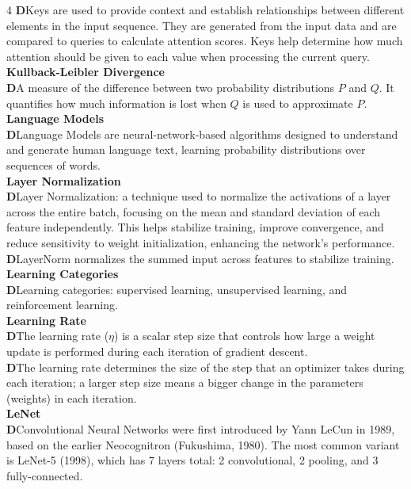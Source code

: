 \documentclass[8pt]{extarticle}
\newcommand{\dtag}{\textcolor{definitioncolor}{\tiny\textbf{D}}\;}
\begin{document}
\begin{multicols}{4}
\dtag Keys are used to provide context and establish relationships between different elements in the input sequence. They are generated from the input data and are compared to queries to calculate attention scores. Keys help determine how much attention should be given to each value when processing the current query.\\
\vspace{2pt}\textbf{Kullback-Leibler Divergence}\\
\dtag A measure of the difference between two probability distributions $P$ and $ Q$. It quantifies how much information is lost when $ Q$ is used to approximate $ P$.\\
\vspace{2pt}\textbf{Language Models}\\
\dtag Language Models are neural-network-based algorithms designed to understand and generate human language text, learning probability distributions over sequences of words.\\
\vspace{2pt}\textbf{Layer Normalization}\\
\dtag Layer Normalization: a technique used to normalize the activations of a layer across the entire batch, focusing on the mean and standard deviation of each feature independently. This helps stabilize training, improve convergence, and reduce sensitivity to weight initialization, enhancing the network's performance.\\
\dtag LayerNorm normalizes the summed input across features to stabilize training.\\
\vspace{2pt}\textbf{Learning Categories}\\
\dtag Learning categories: supervised learning, unsupervised learning, and reinforcement learning.\\
\vspace{2pt}\textbf{Learning Rate}\\
\dtag The learning rate ($\eta$) is a scalar step size that controls how large a weight update is performed during each iteration of gradient descent.\\
\dtag The learning rate determines the size of the step that an optimizer takes during each iteration; a larger step size means a bigger change in the parameters (weights) in each iteration.\\
\vspace{2pt}\textbf{LeNet}\\
\dtag Convolutional Neural Networks were first introduced by Yann LeCun in 1989, based on the earlier Neocognitron (Fukushima, 1980). The most common variant is LeNet-5 (1998), which has 7 layers total: 2 convolutional, 2 pooling, and 3 fully-connected.\\

\end{multicols}
\end{document}
